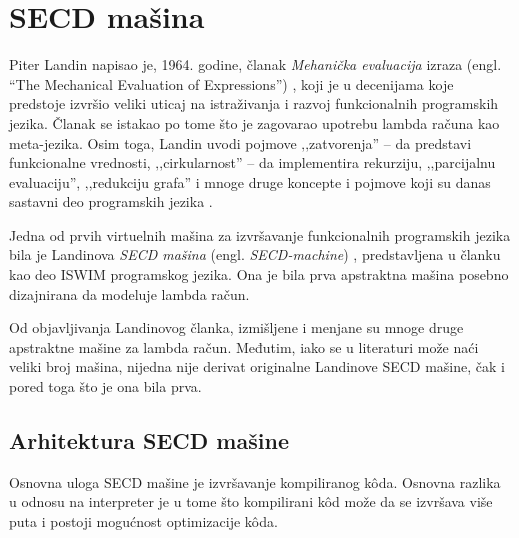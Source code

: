 \documentclass[a4paper]{article}
\begin{document}
\section{SECD mašina}
\label{sec:secd-masina}


Piter Landin napisao je, 1964. godine, članak {\em Mehanička evaluacija} izraza (engl. “The Mechanical Evaluation of Expressions”) \cite{landinsecd}, koji je u decenijama koje predstoje izvršio veliki uticaj na istraživanja i razvoj funkcionalnih programskih jezika. Članak se istakao po tome što je zagovarao upotrebu lambda računa kao meta-jezika. Osim toga, Landin uvodi pojmove ‚‚zatvorenja'' -- da predstavi funkcionalne vrednosti, ‚‚cirkularnost'' -- da implementira rekurziju, ‚‚parcijalnu evaluaciju'', ‚‚redukciju grafa'' i mnoge druge koncepte i pojmove koji su danas sastavni deo programskih jezika \cite{calls-lambda, compiler-design}.

Jedna od prvih virtuelnih mašina za izvršavanje funkcionalnih programskih jezika bila je Landinova {\em SECD mašina} (engl. \textit{SECD-machine}) \cite{landin-secd}, predstavljena u članku kao deo ISWIM \cite{ISWIM} programskog jezika. Ona je bila prva apstraktna mašina posebno dizajnirana da modeluje lambda račun.

Od objavljivanja Landinovog članka, izmišljene i menjane su mnoge druge apstraktne mašine za lambda račun. Međutim, iako se u literaturi može naći veliki broj mašina, nijedna nije derivat originalne Landinove SECD mašine, čak i pored toga što je ona bila prva.


\subsection{Arhitektura SECD mašine}

Osnovna uloga SECD mašine je izvršavanje kompiliranog k\^oda. Osnovna razlika u odnosu na interpreter je u tome što kompilirani k\^od može da se izvršava više puta i postoji mogućnost optimizacije k\^oda. 
\end{document}
